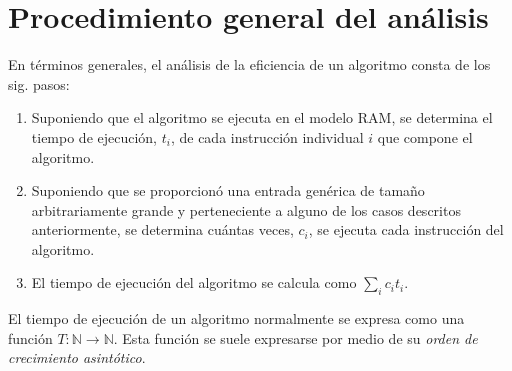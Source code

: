 \section{Procedimiento general del análisis}

En términos generales, el análisis de la eficiencia de un algoritmo consta de los sig. pasos:
\begin{enumerate}
  \item Suponiendo que el algoritmo se ejecuta en el modelo RAM, se determina el tiempo de ejecución, \(t_i\), de cada instrucción individual \(i\) que compone el algoritmo.
  \item Suponiendo que se proporcionó una entrada genérica de tamaño arbitrariamente grande y perteneciente a alguno de los casos descritos anteriormente, se determina cuántas veces, \(c_i\), se ejecuta cada instrucción del algoritmo.
  \item El tiempo de ejecución del algoritmo se calcula como \(\sum_i c_it_i\).
\end{enumerate}

El tiempo de ejecución de un algoritmo normalmente se expresa como una función \(T:\mathbb{N}\to\mathbb{N}\).
Esta función se suele expresarse por medio de su \emph{orden de crecimiento asintótico}.


